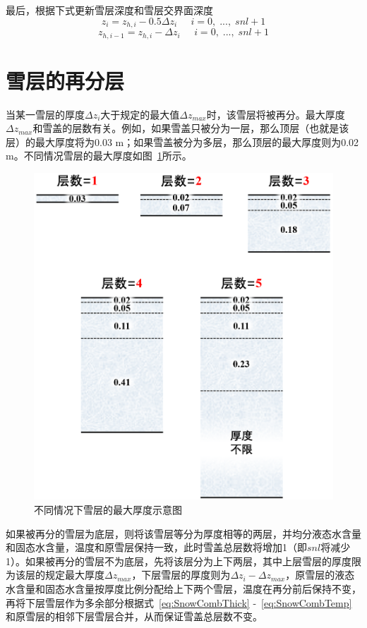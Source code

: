 最后，根据下式更新雪层深度和雪层交界面深度
\begin{equation}
    z_i=z_{h,i}-0.5\Delta z_i \;\;\;\;\;i=0,\;...,\;snl+1
\end{equation}
\begin{equation}
    z_{h,i-1}=z_{h,i}-\Delta z_i \;\;\;\;\;i=0,\;...,\;snl+1
\end{equation}



\section{雪层的再分层}\label{雪层的再分层}
当某一雪层的厚度$\Delta z_i$大于规定的最大值$\Delta z_{max}$时，该雪层将被再分。最大厚度$\Delta z_{max}$和雪盖的层数有关。例如，如果雪盖只被分为一层，那么顶层（也就是该层）的最大厚度将为0.03 \unit{m}；如果雪盖被分为多层，那么顶层的最大厚度则为0.02 \unit{m}。不同情况雪层的最大厚度如图~\ref{fig:不同情况下雪层的最大厚度}所示。

{
\begin{figure}[htbp]
\centering
\includegraphics[width=0.6\columnwidth]{Figures/雪盖土壤热力过程/不同情况下雪层的最大厚度.png}
\caption{不同情况下雪层的最大厚度示意图}
\label{fig:不同情况下雪层的最大厚度}
\end{figure}
}

如果被再分的雪层为底层，则将该雪层等分为厚度相等的两层，并均分液态水含量和固态水含量，温度和原雪层保持一致，此时雪盖总层数将增加1（即$snl$将减少1）。如果被再分的雪层不为底层，先将该层分为上下两层，其中上层雪层的厚度限为该层的规定最大厚度$\Delta z_{max}$，下层雪层的厚度则为$\Delta z_i - \Delta z_{max}$，原雪层的液态水含量和固态水含量按厚度比例分配给上下两个雪层，温度在再分前后保持不变，再将下层雪层作为多余部分根据式~\eqref{eq:SnowCombThick} -~\eqref{eq:SnowCombTemp}和原雪层的相邻下层雪层合并，从而保证雪盖总层数不变。

